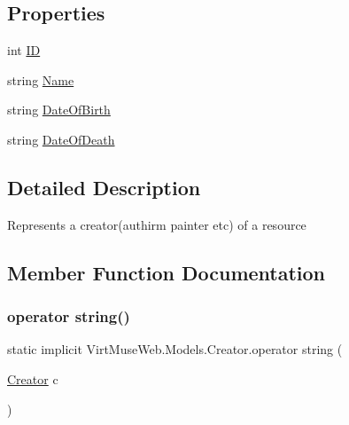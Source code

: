 \subsection*{Properties}
\begin{DoxyCompactItemize}
\item 
int \mbox{\hyperlink{class_virt_muse_web_1_1_models_1_1_creator_a540ba648434a7b62cec37a82742a2896}{ID}}
\item 
string \mbox{\hyperlink{class_virt_muse_web_1_1_models_1_1_creator_a4ebb4ac1c0dede1965066e5dc9c13061}{Name}}
\item 
string \mbox{\hyperlink{class_virt_muse_web_1_1_models_1_1_creator_acfafda84c90f8164b8fcc65264209881}{Date\+Of\+Birth}}
\item 
string \mbox{\hyperlink{class_virt_muse_web_1_1_models_1_1_creator_a2d4c062cfd1e12ffc9cb918f476360d7}{Date\+Of\+Death}}
\end{DoxyCompactItemize}


\subsection{Detailed Description}
Represents a creator(authirm painter etc) of a resource 



\subsection{Member Function Documentation}
\mbox{\label{class_virt_muse_web_1_1_models_1_1_creator_ad3d2833de2c44e05455711b8a987bcfb}} 
\subsubsection{\texorpdfstring{operator string()}{operator string()}}
{\footnotesize\ttfamily static implicit Virt\+Muse\+Web.\+Models.\+Creator.\+operator string (\begin{DoxyParamCaption}\item[{\mbox{\hyperlink{class_virt_muse_web_1_1_models_1_1_creator}{Creator}}}]{c }\end{DoxyParamCaption})\hspace{0.3cm}{\ttfamily [static]}}



